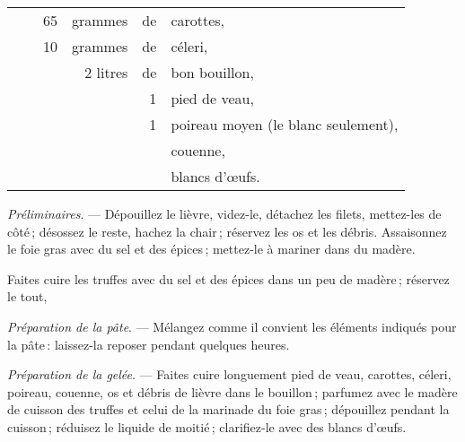 \footnotesize
\begin{longtable}{rrrrrp{18em}}
  & \hspace{2em} &  65 &  grammes & de & carottes,                                                        \\
  & \hspace{2em} &  10 &  grammes & de & céleri,                                                          \\
  & \hspace{2em} &     & 2 litres & de & bon bouillon,                                                    \\
  & \hspace{2em} &     &          &  1 & pied de veau,                                                    \\
  & \hspace{2em} &     &          &  1 & poireau moyen (le blanc seulement),                              \\
  & \hspace{2em} &     &          &    & couenne,                                                         \\
  & \hspace{2em} &     &          &    & blancs d'œufs.                                                   \\
\end{longtable}
\normalsize

\textit{Préliminaires}. — Dépouillez le lièvre, videz-le, détachez les filets,
mettez-les de côté ; désossez le reste, hachez la chair ; réservez les os et
les débris. Assaisonnez le foie gras avec du sel et des épices ; mettez-le
à mariner dans du madère.

Faites cuire les truffes avec du sel et des épices dans un peu de madère ;
réservez le tout,

\medskip

\textit{Préparation de la pâte}. — Mélangez comme il convient les éléments
indiqués pour la pâte : laissez-la reposer pendant quelques heures.

\medskip

\textit{Préparation de la gelée}. — Faites cuire longuement pied de veau,
carottes, céleri, poireau, couenne, os et débris de lièvre dans le bouillon ;
parfumez avec le madère de cuisson des truffes et celui de la marinade du foie
gras ; dépouillez pendant la cuisson ; réduisez le liquide de moitié ;
clarifiez-le avec des blancs d'œufs.

